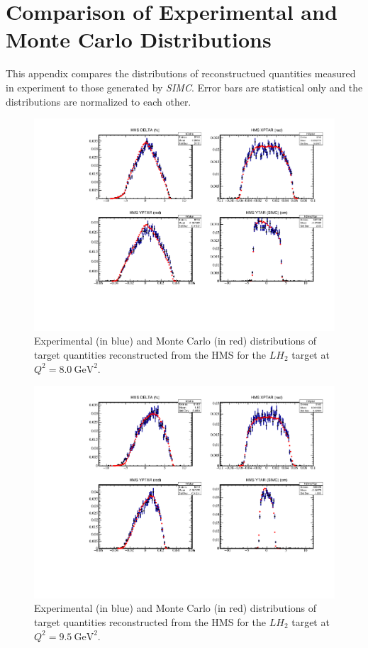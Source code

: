 \chapter{Comparison of Experimental and Monte Carlo Distributions} \label{app:distributions}
This appendix compares the distributions of reconstructued quantities measured in experiment
to those generated by \textit{SIMC}.
Error bars are statistical only and the distributions are normalized to each other.
\begin{figure}[!h]
    \centering
    \includegraphics[page=1,width=1.0\textwidth]{pass5_report/Report_h8.pdf}
    \caption{
            Experimental (in blue) and Monte Carlo (in red) distributions of
            target quantities reconstructed from the HMS for
            the $LH_2$ target at $Q^2=\SI{8.0}{\giga\electronvolt\squared}$.
            }
    \label{fig:Report_h8.pdf}
\end{figure}


\begin{figure}[!h]
    \centering
    \includegraphics[page=1,width=1.0\textwidth]{pass5_report/Report_h95sm.pdf}
    \caption{
            Experimental (in blue) and Monte Carlo (in red) distributions of
            target quantities reconstructed from the HMS for
            the $LH_2$ target at $Q^2=\SI{9.5}{\giga\electronvolt\squared}$.
            }
    \label{fig:Report_h95sm.pdf}
\end{figure}


